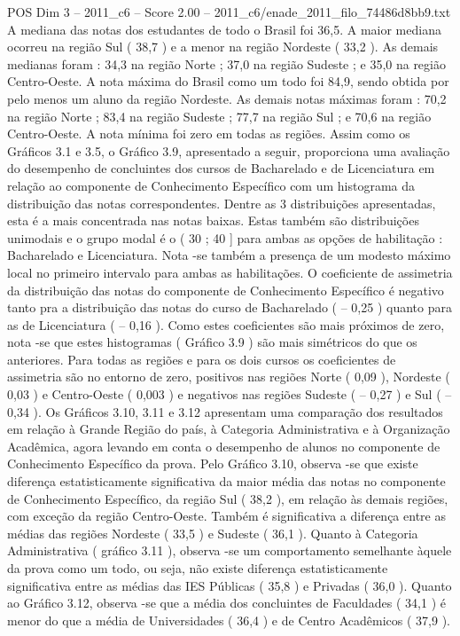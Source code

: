 \begin{textsample}{POS Dim 3 – 2011\_c6 – Score 2.00 – 2011\_c6/enade\_2011\_filo\_74486d8bb9.txt}
A mediana das notas dos estudantes de todo o Brasil foi 36,5.
A maior mediana ocorreu na região Sul ( 38,7 ) e a menor na região Nordeste ( 33,2 ).
As demais medianas foram : 34,3 na região Norte ; 37,0 na região Sudeste ; e 35,0 na região Centro-Oeste.
A nota máxima do Brasil como um todo foi 84,9, sendo obtida por pelo menos um aluno da região Nordeste.
As demais notas máximas foram : 70,2 na região Norte ; 83,4 na região Sudeste ; 77,7 na região Sul ; e 70,6 na região Centro-Oeste.
A nota mínima foi zero em todas as regiões.
Assim como os Gráficos 3.1 e 3.5, o Gráfico 3.9, apresentado a seguir, proporciona uma avaliação do desempenho de concluintes dos cursos de Bacharelado e de Licenciatura em relação ao componente de Conhecimento Específico com um histograma da distribuição das notas correspondentes.
Dentre as 3 distribuições apresentadas, esta é a mais concentrada nas notas baixas.
Estas também são distribuições unimodais e o grupo modal é o ( 30 ; 40 ] para ambas as opções de habilitação : Bacharelado e Licenciatura.
Nota -se também a presença de um modesto máximo local no primeiro intervalo para ambas as habilitações.
O coeficiente de assimetria da distribuição das notas do componente de Conhecimento Específico é negativo tanto pra a distribuição das notas do curso de Bacharelado ( – 0,25 ) quanto para as de Licenciatura ( – 0,16 ).
Como estes coeficientes são mais próximos de zero, nota -se que estes histogramas ( Gráfico 3.9 ) são mais simétricos do que os anteriores.
Para todas as regiões e para os dois cursos os coeficientes de assimetria são no entorno de zero, positivos nas regiões Norte ( 0,09 ), Nordeste ( 0,03 ) e Centro-Oeste ( 0,003 ) e negativos nas regiões Sudeste ( – 0,27 ) e Sul ( – 0,34 ).
Os Gráficos 3.10, 3.11 e 3.12 apresentam uma comparação dos resultados em relação à Grande Região do país, à Categoria Administrativa e à Organização Acadêmica, agora levando em conta o desempenho de alunos no componente de Conhecimento Específico da prova.
Pelo Gráfico 3.10, observa -se que existe diferença estatisticamente significativa da maior média das notas no componente de Conhecimento Específico, da região Sul ( 38,2 ), em relação às demais regiões, com exceção da região Centro-Oeste.
Também é significativa a diferença entre as médias das regiões Nordeste ( 33,5 ) e Sudeste ( 36,1 ).
Quanto à Categoria Administrativa ( gráfico 3.11 ), observa -se um comportamento semelhante àquele da prova como um todo, ou seja, não existe diferença estatisticamente significativa entre as médias das IES Públicas ( 35,8 ) e Privadas ( 36,0 ).
Quanto ao Gráfico 3.12, observa -se que a média dos concluintes de Faculdades ( 34,1 ) é menor do que a média de Universidades ( 36,4 ) e de Centro Acadêmicos ( 37,9 ).

\end{textsample}
